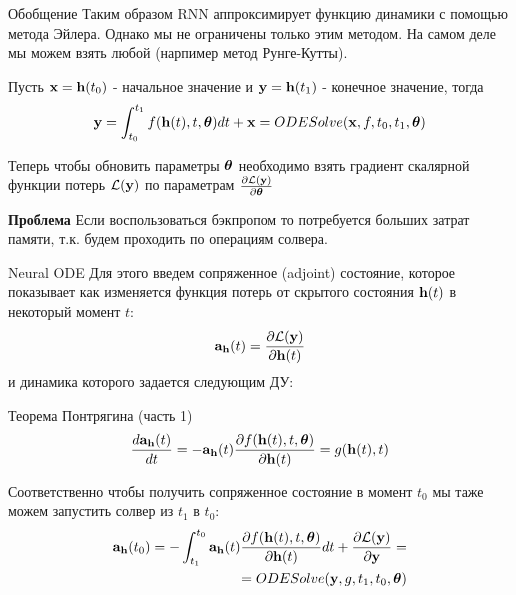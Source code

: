 \begin{frame}{Обобщение}
    Таким образом RNN аппроксимирует функцию динамики  с помощью метода Эйлера.  Однако мы не ограничены только этим методом. На самом деле мы можем взять любой (нарпимер метод Рунге-Кутты). \par
    \begin{block}{}
    Пусть $\mathbf{x} = \mathbf{h}(t_0)$ - начальное значение и $\mathbf{y} = \mathbf{h}(t_1)$ - конечное значение, тогда
    \begin{displaymath}
        \mathbf{y} = \int_{t_0}^{t_1}f(\mathbf{h}(t), t, \boldsymbol{\theta})dt + \mathbf{x} = ODESolve(\mathbf{x}, f, t_0, t_1, \boldsymbol{\theta})
    \end{displaymath}
    \end{block}
    
    Теперь чтобы обновить параметры $\boldsymbol{\theta}$ необходимо взять градиент скалярной функции потерь $\mathcal{L}(\mathbf{y})$ по параметрам $\frac{\partial\mathcal{L}(\mathbf{y})}{\partial \boldsymbol{\theta}}$\par
    \begin{alertblock}{\textbf{Проблема}}
        Если воспользоваться бэкпропом то потребуется больших затрат памяти, т.к. будем проходить по операциям солвера.
    \end{alertblock}
    
\end{frame}

\begin{frame}{Neural ODE}
    Для этого введем сопряженное (adjoint) состояние, которое показывает как изменяется функция потерь от скрытого состояния $\mathbf{h}(t)$ в некоторый момент $t$:
    \begin{displaymath}
            \mathbf{a}_{\mathbf{h}}(t) = \frac{\partial \mathcal{L}(\mathbf{y})}{\partial \mathbf{h}(t)}
    \end{displaymath}
    и динамика которого задается следующим ДУ:
    \begin{block}{Теорема Понтрягина (часть 1)}
        \begin{displaymath}
            \frac{d\mathbf{a}_{\mathbf{h}}(t)}{dt} = -\mathbf{a}_{\mathbf{h}}(t)\frac{\partial f(\mathbf{h}(t), t, \boldsymbol{\theta})}{\partial \mathbf{h}(t)} = g(\mathbf{h}(t), t)
        \end{displaymath}
    \end{block}
    Соответственно чтобы получить сопряженное состояние в момент $t_0$ мы таже можем запустить солвер из $t_1$ в $t_0$:
    \begin{displaymath}
        \begin{split}
            \mathbf{a}_{\mathbf{h}}(t_0) = -\int_{t_1}^{t_0}\mathbf{a}_{\mathbf{h}}(t)\frac{\partial f(\mathbf{h}(t), t, \boldsymbol{\theta})}{\partial \mathbf{h}(t)}dt + \frac{\partial \mathcal{L}(\mathbf{y})}{\partial \mathbf{y}} = \\ = ODESolve(\mathbf{y}, g, t_1, t_0, \boldsymbol{\theta})
        \end{split}
    \end{displaymath}
\end{frame}

